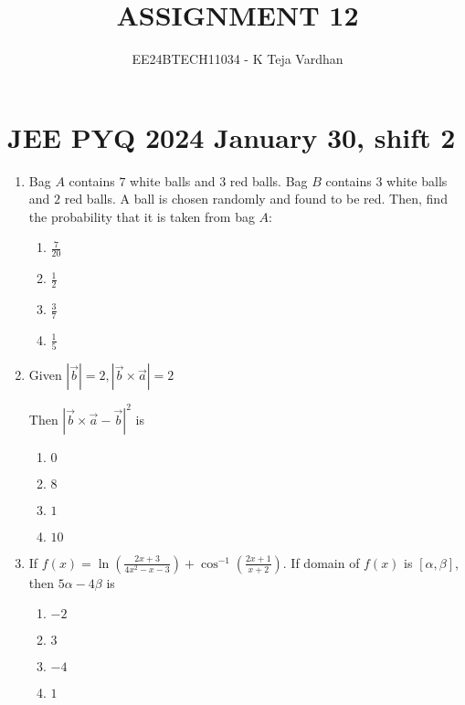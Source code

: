 \documentclass[journal]{IEEEtran}
\newcommand{\brak}[1]{\left( #1 \right)}
\newcommand{\sbrak}[1]{\left[ #1 \right]}
\newcommand{\abs}[1]{\left| #1 \right|}
\begin{document}

\title{ASSIGNMENT 12}
\author{EE24BTECH11034 - K Teja Vardhan}
{\let\newpage\relax\maketitle}

\section{JEE PYQ 2024 January 30, shift 2}
\begin{enumerate}

    \item Bag $A$ contains $7$ white balls and $3$ red balls. Bag $B$ contains $3$ white balls and $2$ red balls. A ball is chosen randomly and found to be red. Then, find the probability that it is taken from bag $A$:

        \begin{multicols}{4}
        \begin{enumerate}
        \item $\frac{7}{20}$
        \item $\frac{1}{2}$
        \item $\frac{3}{7}$
        \item $\frac{1}{5}$
        \end{enumerate}
        \end{multicols}

    \item Given $\abs{\vec{b}}=2, \abs{\vec{b}\times\vec{a}}=2$

    Then $\abs{\vec{b}\times\vec{a}-\vec{b}}^2$ is
    
        \begin{multicols}{4}
        \begin{enumerate}
        \item $0$
        \item $8$
        \item $1$
        \item $10$
        \end{enumerate}
        \end{multicols}

    \item If $f\brak{x}=\ln\brak{\frac{2x+3}{4x^2-x-3}}+\cos^{-1}\brak{\frac{2x+1}{x+2}}$. If domain of $f\brak{x}$ is $\sbrak{\alpha,\beta}$, then $5\alpha-4\beta$ is

        \begin{multicols}{4}
        \begin{enumerate}
        \item $-2$
        \item $3$
        \item $-4$
        \item $1$
        \end{enumerate}
        \end{multicols}


\end{enumerate}
\end{document}
